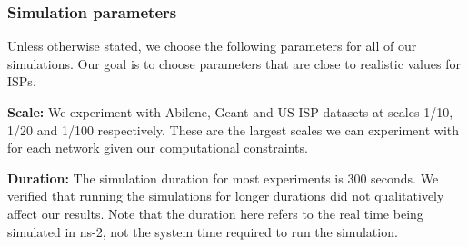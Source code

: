 %
%

\subsubsection{Simulation parameters}
Unless otherwise stated, we choose the following parameters for all of our simulations. Our goal is to choose parameters that are close to realistic values for ISPs.

\noindent\textbf{Scale:}  We experiment with Abilene, Geant and US-ISP datasets at  scales 1/10, 1/20 and 1/100 respectively. These are the largest scales we can experiment with for each network given our computational constraints.

\noindent\textbf{Duration:}  The simulation duration for most experiments is 300 seconds. We verified that running the simulations for longer durations did not qualitatively affect our results. Note that the duration here refers to the real time being simulated in ns-2, not the system time required to run the simulation.


